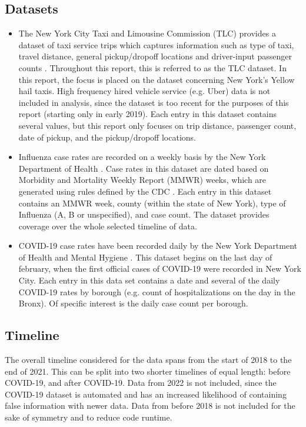 \documentclass[11pt]{article}
\begin{document}
\subsection{Datasets}
\begin{itemize}
    \item The New York City Taxi and Limousine Commission (TLC) provides a dataset of taxi service trips which captures information such as type of taxi, travel distance, general pickup/dropoff locations and driver-input passenger counts \cite{tlcdataset}. 
Throughout this report, this is referred to as the TLC dataset. 
In this report, the focus is placed on the dataset concerning New York's Yellow hail taxis. 
High frequency hired vehicle service (e.g. Uber) data is not included in analysis, 
since the dataset is too recent for the purposes of this report (starting only in early 2019).
Each entry in this dataset contains several values, but this report only focuses on trip distance, passenger count, date of pickup, and the pickup/dropoff locations.
    \item Influenza case rates are recorded on a weekly basis by the New York Department of Health \cite{fludataset}. 
Case rates in this dataset are dated based on Morbidity and Mortality Weekly Report (MMWR) weeks, which are generated using rules defined by the CDC \cite{mmwr}.
Each entry in this dataset contains an MMWR week, county (within the state of New York), type of Influenza (A, B or unspecified), and case count.
The dataset provides coverage over the whole selected timeline of data.
    \item COVID-19 case rates have been recorded daily by the New York Department of Health and Mental Hygiene \cite{coviddataset}.
This dataset begins on the last day of february, when the first official cases of COVID-19 were recorded in New York City. 
Each entry in this data set contains a date and several of the daily COVID-19 rates by borough (e.g. count of hospitalizations on the day in the Bronx).
Of specific interest is the daily case count per borough.
\end{itemize}

\subsection{Timeline}
The overall timeline considered for the data spans from the start of 2018 to the end of 2021.
This can be split into two shorter timelines of equal length: before COVID-19, and after COVID-19.
Data from 2022 is not included, since the COVID-19 dataset is automated and has an increased likelihood of containing false information with newer data.
Data from before 2018 is not included for the sake of symmetry and to reduce code runtime.
\end{document}

